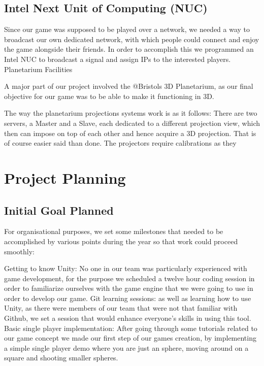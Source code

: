 \documentclass[11pt,a4paper]{article}
\begin{document}
        \subsection{Intel Next Unit of Computing (NUC) }

        Since our game was supposed to be played over a network, we needed a way to broadcast our own dedicated network, with which people could connect and enjoy the game alongside their friends. In order to accomplish this we programmed an Intel NUC to broadcast a signal and assign IPs to the interested players.
        Planetarium Facilities

        A major part of our project involved the @Bristols 3D Planetarium, as our final objective for our game was to be able to make it functioning in 3D.

        The way the planetarium projections systems work is as it follows: There are two servers, a Master and a Slave, each dedicated to a different projection view, which then can impose on top of each other and hence acquire a 3D projection. That is of course easier said than done. The projectors require calibrations as they   


\pagebreak



        \section{Project Planning}

        \subsection{Initial Goal Planned}

        For organisational purposes, we set some milestones that needed to be accomplished by various points during the year so that work could proceed smoothly:

        Getting to know Unity: No one in our team was particularly experienced with game development, for the purpose we scheduled a twelve hour coding session in order to familiarize ourselves with the game engine that we were going to use in order to develop our game.
        Git learning sessions: as well as learning how to use Unity, as there were members of our team that were not that familiar with Github, we set a session that would enhance everyone’s skills in using this tool.
        Basic single player implementation: After going through some tutorials related to our game concept we made our first step of our games creation, by implementing a simple single player demo where you are just an sphere, moving around on a square and shooting smaller spheres.
\end{document}
